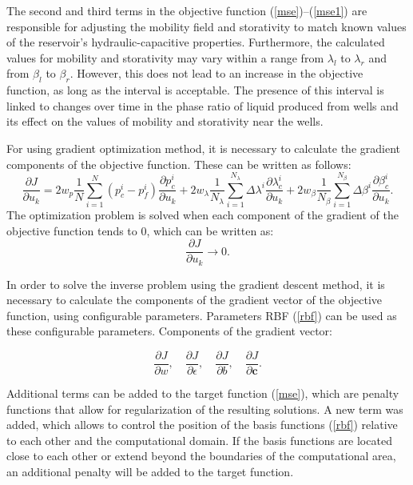 \documentclass[
11pt,%
tightenlines,%
twoside,%
onecolumn,%
nofloats,%
nobibnotes,%
nofootinbib,%
superscriptaddress,%
noshowpacs,%
centertags]%
{revtex4}
\begin{document}
The second and third terms in the objective function ({\ref{mse}})--({\ref{mse1}}) are responsible for adjusting the mobility field and storativity to match known values of the reservoir's hydraulic-capacitive properties. Furthermore, the calculated values for mobility and storativity may vary within a range from $\lambda_l$ to $\lambda_r$ and from $\beta_l$ to $\beta_r$. However, this does not lead to an increase in the objective function, as long as the interval is acceptable. The presence of this interval is linked to changes over time in the phase ratio of liquid produced from wells and its effect on the values of mobility and storativity near the wells.

For using gradient optimization method, it is necessary to calculate the gradient components of the objective function. These can be written as follows:
\begin{equation*}\label{grad}
	\frac{\partial J}{\partial u_k} = 
	2w_p\frac{1}{N}\sum_{i=1}^N	({p_c^i-p_f^i}) \frac{\partial p_c^i}{\partial u_k}+
	2w_{\lambda}\frac{1}{N_\lambda}\sum_{i=1}^{N_\lambda}{\Delta\lambda^i}\frac{\partial
		\lambda_{c}^i}{\partial u_k}+
	2w_{\beta}\frac{1}{N_\beta}\sum_{i=1}^{N_\beta}{\Delta\beta^i}\frac{\partial
		\beta_{c}^i}{\partial u_k}.
\end{equation*}
The optimization problem is solved when each component of the gradient of the objective function tends to 0, which can be written as:
\begin{equation} \label{rp}
	\frac{\partial J}{\partial u_k} \rightarrow 0.
\end{equation}

In order to solve the inverse problem using the gradient descent method, it is necessary to calculate the components of the gradient vector of the objective function, using configurable parameters. Parameters RBF (\ref{rbf}) can be used as these configurable parameters. Components of the gradient vector:

\begin{equation*}
	\frac{\partial J}{\partial w},\quad \frac{\partial J}{\partial \epsilon},\quad \frac{\partial J}{\partial b}, \quad \frac{\partial J}{\partial \mathbf{c}}.
\end{equation*}

Additional terms can be added to the target function (\ref{mse}), which are penalty functions that allow for regularization of the resulting solutions. A new term was added, which allows  to control the position of the basis functions (\ref{rbf}) relative to each other and the computational domain. If the basis functions are located close to each other or extend beyond the boundaries of the computational area, an additional penalty will be added to the target function.
\end{document}
